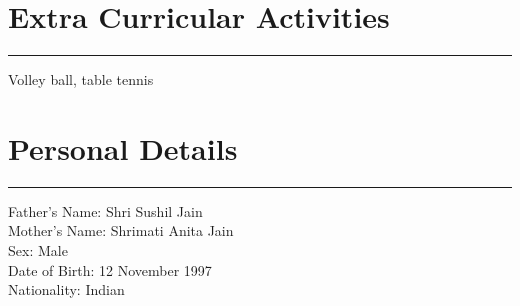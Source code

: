 \documentclass{article}
\begin{document}
\section{Extra Curricular Activities}
\vspace{-1.2em}
\hrule height 0.7pt
\vspace {1em}
\hspace{3em}
Volley ball, table tennis\\


\section{Personal Details }
\vspace{-1.2em}
\hrule height 0.7pt
\vspace {1em}
\begin{adjustwidth}{3.5em}{0pt}
Father's Name: Shri Sushil Jain\\
Mother's Name: Shrimati Anita Jain\\
Sex: Male\\
Date of Birth: 12 November 1997\\
Nationality: Indian
\end{adjustwidth}
\end{document}
